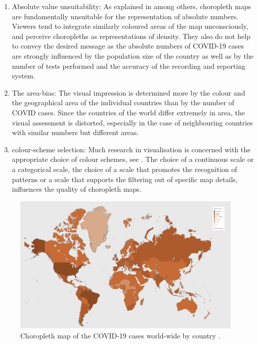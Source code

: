 \documentclass[article]{jdssv}\usepackage[]{graphicx}\usepackage[]{color}
\begin{document}
\begin{enumerate}
\item Absolute value unsuitability: As explained in \citep{monmonier2005, slocum2008, speckmann2010} among others, choropleth maps are fundamentally unsuitable for the representation of absolute numbers. Viewers tend to integrate similarly coloured areas of the map unconsciously, and perceive choropleths as representations of density. They also do not help to convey the desired message as the absolute numbers of COVID-19 cases are strongly influenced by the population size of the country as well as by the number of tests performed and the accuracy of the recording and reporting system. 
\item The area-bias: The visual impression is determined more by the colour and the geographical area of the individual countries than by the number of COVID cases. Since the countries of the world differ extremely in area, the visual assessment is distorted, especially in the case of neighbouring countries with similar numbers but different areas.
\item colour-scheme selection: Much research in visualisation is concerned with the appropriate choice of colour schemes, see \citep{brewer1997, color2021}. The choice of a continuous scale or a categorical scale, the choice of a scale that promotes the recognition of patterns or a scale that supports the filtering out of specific map details, influences the quality of choropleth maps.
\end{enumerate}

\begin{figure}
	\includegraphics[width = 0.98\textwidth]{Figures_Web/who_totalcases_choro.png}
	\caption{Choropleth map of the COVID-19 cases world-wide by country \citep{WHOCoronavirusCOVID19}.}
	\label{fig:choro1}
\end{figure}
\end{document}
